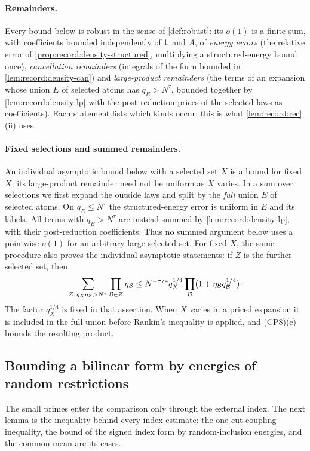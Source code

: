 \paragraph{Remainders.}
Every bound below is robust in the sense of \cref{def:robust}: its $o(1)$ is
a finite sum, with coefficients bounded independently of $\mathsf L$ and $A$, of
\emph{energy errors} (the relative error of
\cref{prop:record:density-structured}, multiplying a structured-energy bound
once), \emph{cancellation remainders} (integrals of the form bounded in
\cref{lem:record:density-can}) and \emph{large-product remainders} (the terms
of an expansion whose union $E$ of selected atoms has $q_E>N^\tau$, bounded
together by \cref{lem:record:density-lp} with the post-reduction prices of
the selected laws as coefficients). Each statement lists which kinds occur;
this is what \cref{lem:record:rec}(ii) uses.

\paragraph{Fixed selections and summed remainders.}
An individual asymptotic bound below with a selected set $X$ is a bound
for fixed $X$; its large-product remainder need not be uniform as $X$
varies. In a sum over selections we first expand the outside laws and
split by the \emph{full} union $E$ of selected atoms. On $q_E\le N^\tau$
the structured-energy error is uniform in $E$ and its labels. All terms
with $q_E>N^\tau$ are instead summed by
\cref{lem:record:density-lp}, with their post-reduction coefficients.
Thus no summed argument below uses a pointwise $o(1)$ for an arbitrary
large selected set. For fixed $X$, the same procedure also proves the
individual asymptotic statements: if $Z$ is the further selected set,
then
\[
 \sum_{Z:\,q_Xq_Z>N^\tau}\prod_{\mathcal B\in Z}\eta_\mathcal B
 \le N^{-\tau/4}q_X^{1/4}
 \prod_\mathcal B(1+\eta_\mathcal B q_\mathcal B^{1/4}).
\]
The factor $q_X^{1/4}$ is fixed in that assertion. When $X$ varies in a
priced expansion it is included in the full union before Rankin's
inequality is applied, and (CP8)(c) bounds the resulting product.

\subsection{Bounding a bilinear form by energies of random restrictions}

The small primes enter the comparison only through the external index. The
next lemma is the inequality behind every index estimate: the one-cut
coupling inequality, the bound of the signed index form by random-inclusion
energies, and the common mean are its cases.

